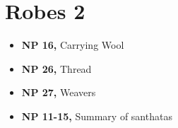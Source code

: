\chapter{Robes 2}

\begin{itemize}
\tightlist
\item
  \textbf{NP 16,} Carrying Wool
\item
  \textbf{NP 26,} Thread
\item
  \textbf{NP 27,} Weavers
\item
  \textbf{NP 11-15,} Summary of santhatas
\end{itemize}

